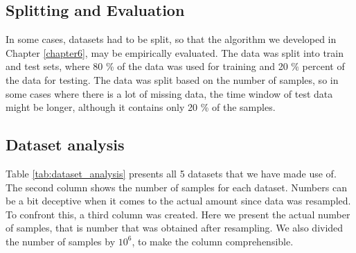 \subsection{Splitting and Evaluation} \label{ssec:ds_eval}

In some cases, datasets had to be split, so that the algorithm we developed in Chapter \ref{chapter6}, may be empirically evaluated. 
The data was split into train and test sets, where 80 \% of the data was used for training and 20 \% percent of the data for testing.
The data was split based on the number of samples, so in some cases where there is a lot of missing data, the time window of test data might be longer, although it contains only 20 \% of the samples.

\subsection{Dataset analysis}
Table \ref{tab:dataset_analysis} presents all 5 datasets that we have made use of.
The second column shows the number of samples for each dataset.
Numbers can be a bit deceptive when it comes to the actual amount since data was resampled.
To confront this, a third column was created.
Here we present the actual number of samples,
that is number that was obtained after resampling.
We also divided the number of samples by $10^6$, to make the column comprehensible.


